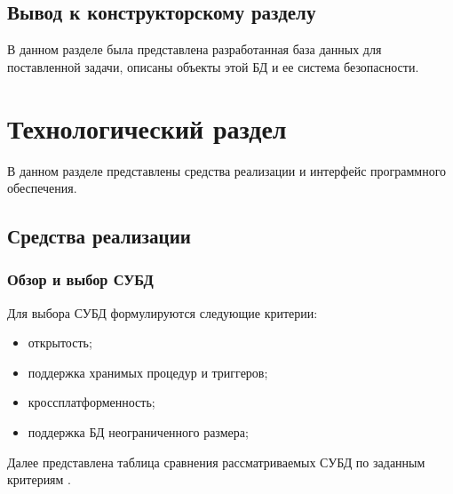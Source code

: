 \documentclass[a4paper,14pt]{extreport}
\begin{document}
\section*{Вывод к конструкторскому разделу}

В данном разделе была представлена разработанная база данных для поставленной задачи, описаны объекты этой БД и ее система безопасности.

\chapter{Технологический раздел}

В данном разделе представлены средства реализации и интерфейс программного обеспечения.

\section{Средства реализации}

\subsection*{Обзор и выбор СУБД}

Для выбора СУБД формулируются следующие критерии:

\begin{itemize}
	\item открытость;
	\item поддержка хранимых процедур и триггеров;
	\item кроссплатформенность;
	\item поддержка БД неограниченного размера;
\end{itemize}

Далее представлена таблица сравнения рассматриваемых СУБД по заданным критериям \cite{orc_db, mssql, pg, db2}.
\end{document}
